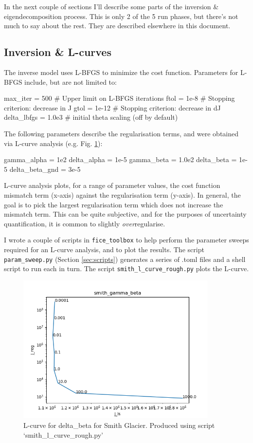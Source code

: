 \documentclass[11pt, reqno, nocenter]{article}
\begin{document}
In the next couple of sections I'll describe some parts of the inversion \& eigendecomposition process. This is only 2 of the 5 run phases, but there's not much to say about the rest. They are described elsewhere in this document.

\subsection{Inversion \& L-curves}

The inverse model uses L-BFGS to minimize the cost function. Parameters for L-BFGS include, but are not limited to:

\begin{spverbatim}
[inversion]
max_iter = 500       # Upper limit on L-BFGS iterations
ftol = 1e-8          # Stopping criterion: decrease in J
gtol = 1e-12         # Stopping criterion: decrease in dJ
delta_lbfgs = 1.0e3  # initial theta scaling (off by default)
\end{spverbatim}

The following parameters describe the regularisation terms, and were obtained via L-curve analysis (e.g. Fig. \ref{fig:smith_lcurve}):
\begin{spverbatim}
gamma_alpha = 1e2
delta_alpha = 1e-5
gamma_beta = 1.0e2
delta_beta = 1e-5
delta_beta_gnd = 3e-5
\end{spverbatim}


L-curve analysis plots, for a range of parameter values, the cost function mismatch term (x-axis) against the regularisation term (y-axis).
In general, the goal is to pick the largest regularisation term which does not increase the mismatch term.
This can be quite subjective, and for the purposes of uncertainty quantification, it is common to slightly \emph{over}regularise.

I wrote a couple of scripts in {\tt fice\_toolbox} to help perform the parameter sweeps required for an L-curve analysis, and to plot the results. The script {\tt param\_sweep.py} (Section \ref{sec:scripts}) generates a series of .toml files and a shell script to run each in turn. The script {\tt smith\_l\_curve\_rough.py} plots the L-curve.

\begin{figure}[!htbp]
  \centering
  \includegraphics[width=10cm]{./figures/smith_gamma_beta.png}
  \caption[L-curve for delta\_beta for Smith Glacier]{L-curve for delta\_beta for Smith Glacier. Produced using script `smith\_l\_curve\_rough.py'}
      \label{fig:smith_lcurve}
\end{figure}
\end{document}

